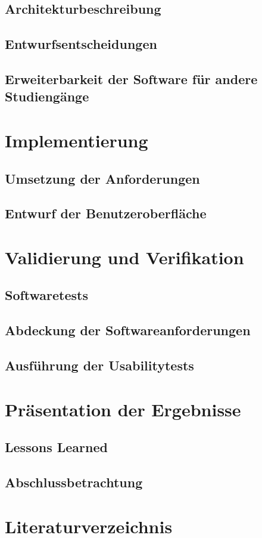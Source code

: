 \documentclass{scrreprt}
\begin{document}
\section{Architekturbeschreibung}

\section{Entwurfsentscheidungen}

\section{Erweiterbarkeit der Software für andere Studiengänge}


\chapter{Implementierung}

\section{Umsetzung der Anforderungen}

\section{Entwurf der Benutzeroberfläche}


\chapter{Validierung und Verifikation}

\section{Softwaretests}

\section{Abdeckung der Softwareanforderungen}

\section{Ausführung der Usabilitytests}


\chapter{Präsentation der Ergebnisse}

\section{Lessons Learned}

\section{Abschlussbetrachtung}


\chapter{Literaturverzeichnis}
\nocite{*}
\printbibliography
\end{document}
